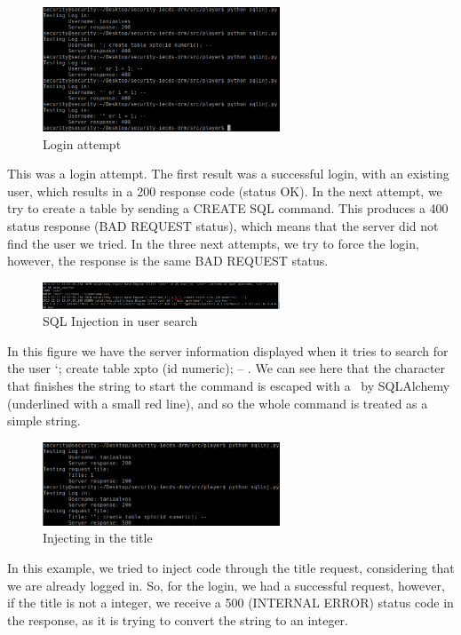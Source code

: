 \documentclass[11pt,a4paper]{report}
\begin{document}
\begin{figure}[H]
\centerline{\includegraphics[width=200pt]{images/loginTest.png}}
\caption{Login attempt}
\label{player}
\end{figure}
This was a login attempt. The first result was a successful login, with an existing user, which results in a 200 response code (status OK). In the next attempt, we try to create a table by sending a CREATE SQL command. This produces a 400 status response (BAD REQUEST status), which means that the server did not find the user we tried. In the three next attempts, we try to force the login, however, the response is the same BAD REQUEST status.

\begin{figure}[H]
\centerline{\includegraphics[width=200pt]{images/escapedChar.png}}
\caption{SQL Injection in user search}
\label{player}
\end{figure}
In this figure we have the server information displayed when it tries to search for the user ‘; create table xpto (id numeric); -- . We can see here that the character that finishes the string to start the command is escaped with a \ by SQLAlchemy (underlined with a small red line), and so the whole command is treated as a simple string.

\begin{figure}[H]
\centerline{\includegraphics[width=200pt]{images/requestTitleTest.png}}
\caption{Injecting in the title}
\label{player}
\end{figure}

In this example, we tried to inject code through the title request, considering that we are already logged in. So, for the login, we had a successful request, however, if the title is not a integer, we receive a 500 (INTERNAL ERROR) status code in the response, as it is trying to convert the string to an integer.
\end{document}
